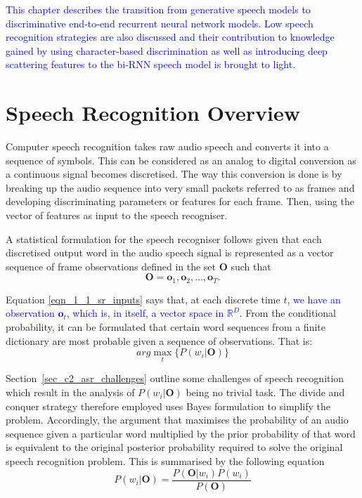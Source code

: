 \textcolor{blue}{This chapter describes the transition from generative speech models to discriminative end-to-end recurrent neural network models.  Low speech recognition strategies are also discussed and their contribution to knowledge gained by using character-based discrimination as well as introducing deep scattering features to the bi-RNN speech model is brought to light.}

\section{Speech Recognition Overview}\label{Ch_2_SROverview}
Computer speech recognition takes raw audio speech and converts it into a sequence of symbols.  This can be considered as an analog to digital conversion as a continuous signal becomes discretised.  The way this conversion is done is by breaking up the audio sequence into very small packets referred to as frames and developing discriminating parameters or features for each frame. Then, using the vector of features as input to the speech recogniser.  

A statistical formulation \citep{young2002htk} for the speech recogniser follows given that each discretised output word in the audio speech signal is represented as a vector sequence of frame observations defined in the set $\mathbf{O}$ such that 
\begin{equation}\mathbf{O}=\mathbf{o}_1,\mathbf{o}_2,\dots,\mathbf{o}_T.
\label{eqn_1_1_sr_inputs}
\end{equation}

Equation \ref{eqn_1_1_sr_inputs} says that, at each discrete time $t$, \textcolor{blue}{we have an observation $\mathbf{o}_t$, which is, in itself,  a vector space in $\mathbb{R}^D$}.  From the conditional probability, it can be formulated that certain word sequences from a finite dictionary are most probable given a sequence of observations. That is:
\begin{equation}arg\max_t\{P(w_i|\mathbf{O})\}
\label{eqn_2_2_srgen}
\end{equation}

Section~\ref{sec_c2_asr_challenges} outline some challenges of  speech recognition which result in the  analysis of $P(w_i|\mathbf{O})$ being no trivial task.  The divide and conquer strategy therefore employed uses Bayes formulation to simplify the problem.  Accordingly, the argument that maximises the probability of an audio sequence given a particular word multiplied by the prior probability of that word is equivalent to the original posterior probability required to solve the original speech recognition problem. This is summarised by the following equation
\begin{equation}P(w_i|\mathbf{O})=\frac{P(\mathbf{O}|w_i)P(w_i)}{P(\mathbf{O})}
\label{eqn_2_3_bayes_sr}
\end{equation}

